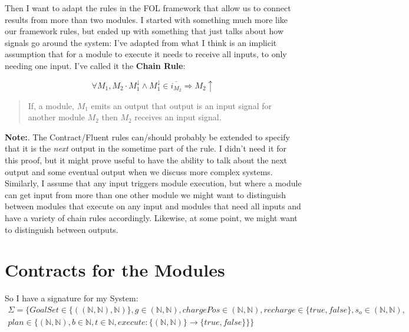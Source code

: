 \documentclass{blue-book}
\begin{document}
Then I want to adapt the rules in the FOL framework that allow us to connect results from more than two modules.  I started with something much more like our framework rules, but ended up with something that just talks about how signals go around the system:   I've adapted from what I think is an implicit assumption that for a module to execute it needs to receive all inputs, to only needing one input.  I've called it the {\bf Chain Rule}:

\begin{equation}
\forall M_1, M_2 \cdot M_1^{\downarrow} \land M_1^{\downarrow} \in \overline{i_{M_2}} \Rightarrow M_2{\uparrow}
\label{eq:chain}
\end{equation}
\begin{quote}
If, a module, $M_1$ emits an output that output is an input signal for another module $M_2$ then $M_2$ receives an input signal.
\end{quote}

{\bf Note:}. The Contract/Fluent rules can/should probably be extended to specify that it is the \emph{next} output in the sometime part of the rule.  I didn't need it for this proof, but it might prove useful to have the ability to talk about the next output and some eventual output when we discuss more complex systems.  Similarly, I assume that any input triggers module execution, but where a module can get input from more than one other module we might want to distinguish between modules that execute on any input and modules that need all inputs and have a variety of chain rules accordingly.  Likewise, at some point, we might want to distinguish between outputs.

\section{Contracts for the Modules}
So I have a signature for my System:
$$
\begin{array}{r}
\Sigma = \{GoalSet \in \{((\mathbb{N}, \mathbb{N}), \mathbb{N})\}, g \in (\mathbb{N}, \mathbb{N}), chargePos \in (\mathbb{N}, \mathbb{N}), recharge \in \{true, false\}, s_o \in (\mathbb{N}, \mathbb{N}), \\
plan \in \{(\mathbb{N}, \mathbb{N}), b \in \mathbb{N}, t\in \mathbb{N}, execute:\{(\mathbb{N}, \mathbb{N})\} \rightarrow \{true, false\}\}\}
\end{array}
$$
\end{document}
